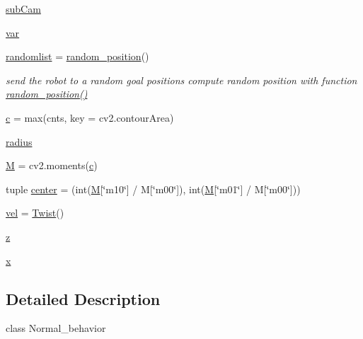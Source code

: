 \begin{DoxyCompactItemize}
\hyperlink{classstate__machine_1_1Normal_a813c3112edc54d4146e8c07ef6f7e040}{sub\+Cam}
\item 
\hyperlink{classstate__machine_1_1Normal_a9696c713d102313a01209dce8e05aea3}{var}
\item 
\hyperlink{classstate__machine_1_1Normal_ac4a9f6b5f01a6edbde7d181dea3bd92a}{randomlist} = \hyperlink{namespacestate__machine_ad624b5f98b8358f20b7cecc4b88c9f52}{random\+\_\+position}()
\begin{DoxyCompactList}\small\item\em send the robot to a random goal positions compute random position with function \hyperlink{namespacestate__machine_ad624b5f98b8358f20b7cecc4b88c9f52}{random\+\_\+position()} \end{DoxyCompactList}\item 
\hyperlink{classstate__machine_1_1Normal_a9e0c7641755e2614e74b3228fbef0a82}{c} = max(cnts, key = cv2.\+contour\+Area)
\item 
\hyperlink{classstate__machine_1_1Normal_afa87ced0c5fa2d65c957a16bd517fc39}{radius}
\item 
\hyperlink{classstate__machine_1_1Normal_a8b720e4cdaf1aff877cc16eb72887ca4}{M} = cv2.\+moments(\hyperlink{classstate__machine_1_1Normal_a9e0c7641755e2614e74b3228fbef0a82}{c})
\item 
tuple \hyperlink{classstate__machine_1_1Normal_a91a5741f842196647b0f7267ce568aeb}{center} = (int(\hyperlink{classstate__machine_1_1Normal_a8b720e4cdaf1aff877cc16eb72887ca4}{M}\mbox{[}\char`\"{}m10\char`\"{}\mbox{]} / M\mbox{[}\char`\"{}m00\char`\"{}\mbox{]}), int(\hyperlink{classstate__machine_1_1Normal_a8b720e4cdaf1aff877cc16eb72887ca4}{M}\mbox{[}\char`\"{}m01\char`\"{}\mbox{]} / M\mbox{[}\char`\"{}m00\char`\"{}\mbox{]}))
\item 
\hyperlink{classstate__machine_1_1Normal_aa1d4a50c677406423e29048758a79596}{vel} = \hyperlink{classstate__machine_1_1Normal_a6f6f347ff2c917d80cdb28f42e7cfd47}{Twist}()
\item 
\hyperlink{classstate__machine_1_1Normal_a6261e388441dd73175646b4eb06453f7}{z}
\item 
\hyperlink{classstate__machine_1_1Normal_a474c7681d4377c15bf89a5062887bd49}{x}
\end{DoxyCompactItemize}


\subsection{Detailed Description}
class Normal\+\_\+behavior 

